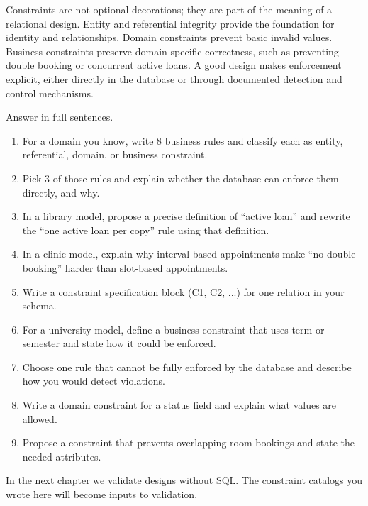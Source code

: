 \begin{chaptersummary}
Constraints are not optional decorations; they are part of the meaning of a relational design.
Entity and referential integrity provide the foundation for identity and relationships.
Domain constraints prevent basic invalid values.
Business constraints preserve domain-specific correctness, such as preventing double booking or concurrent active loans.
A good design makes enforcement explicit, either directly in the database or through documented detection and control mechanisms.
\end{chaptersummary}

\begin{exercisebox}
Answer in full sentences.
\begin{enumerate}[label=\arabic*.]
  \item For a domain you know, write 8 business rules and classify each as entity, referential, domain, or business constraint.
  \item Pick 3 of those rules and explain whether the database can enforce them directly, and why.
  \item In a library model, propose a precise definition of “active loan” and rewrite the “one active loan per copy” rule using that definition.
  \item In a clinic model, explain why interval-based appointments make “no double booking” harder than slot-based appointments.
  \item Write a constraint specification block (C1, C2, ...) for one relation in your schema.
  \item For a university model, define a business constraint that uses term or semester and state how it could be enforced.
  \item Choose one rule that cannot be fully enforced by the database and describe how you would detect violations.
  \item Write a domain constraint for a status field and explain what values are allowed.
  \item Propose a constraint that prevents overlapping room bookings and state the needed attributes.
\end{enumerate}
\end{exercisebox}

In the next chapter we validate designs without SQL.
The constraint catalogs you wrote here will become inputs to validation.
